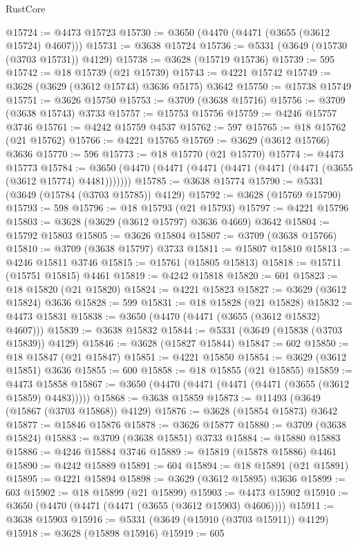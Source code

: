 \begin{lexlean}{RustCore}
\begin{coremodule}
@15724 := @4473 @15723
@15730 := @3650 (@4470 (@4471 (@3655 (@3612 @15724) @4607)))
@15731 := @3638 @15724
@15736 := @5331 (@3649 (@15730 (@3703 @15731)) @4129)
@15738 := @3628 (@15719 @15736)
@15739 := 595
@15742 := @18 @15739 (@21 @15739)
@15743 := @4221 @15742
@15749 := @3628 (@3629 (@3612 @15743) @3636 @5175) @3642
@15750 := @15738 @15749
@15751 := @3626 @15750
@15753 := @3709 (@3638 @15716)
@15756 := @3709 (@3638 @15743) @3733
@15757 := @15753 @15756
@15759 := @4246 @15757 @3746
@15761 := @4242 @15759 @4537
@15762 := 597
@15765 := @18 @15762 (@21 @15762)
@15766 := @4221 @15765
@15769 := @3629 (@3612 @15766) @3636
@15770 := 596
@15773 := @18 @15770 (@21 @15770)
@15774 := @4473 @15773
@15784 := @3650 (@4470 (@4471 (@4471 (@4471 (@4471 (@4471 (@3655 (@3612 @15774) @4481)))))))
@15785 := @3638 @15774
@15790 := @5331 (@3649 (@15784 (@3703 @15785)) @4129)
@15792 := @3628 (@15769 @15790)
@15793 := 598
@15796 := @18 @15793 (@21 @15793)
@15797 := @4221 @15796
@15803 := @3628 (@3629 (@3612 @15797) @3636 @4669) @3642
@15804 := @15792 @15803
@15805 := @3626 @15804
@15807 := @3709 (@3638 @15766)
@15810 := @3709 (@3638 @15797) @3733
@15811 := @15807 @15810
@15813 := @4246 @15811 @3746
@15815 := @15761 (@15805 @15813)
@15818 := @15711 (@15751 @15815) @4461
@15819 := @4242 @15818
@15820 := 601
@15823 := @18 @15820 (@21 @15820)
@15824 := @4221 @15823
@15827 := @3629 (@3612 @15824) @3636
@15828 := 599
@15831 := @18 @15828 (@21 @15828)
@15832 := @4473 @15831
@15838 := @3650 (@4470 (@4471 (@3655 (@3612 @15832) @4607)))
@15839 := @3638 @15832
@15844 := @5331 (@3649 (@15838 (@3703 @15839)) @4129)
@15846 := @3628 (@15827 @15844)
@15847 := 602
@15850 := @18 @15847 (@21 @15847)
@15851 := @4221 @15850
@15854 := @3629 (@3612 @15851) @3636
@15855 := 600
@15858 := @18 @15855 (@21 @15855)
@15859 := @4473 @15858
@15867 := @3650 (@4470 (@4471 (@4471 (@4471 (@3655 (@3612 @15859) @4483)))))
@15868 := @3638 @15859
@15873 := @11493 (@3649 (@15867 (@3703 @15868)) @4129)
@15876 := @3628 (@15854 @15873) @3642
@15877 := @15846 @15876
@15878 := @3626 @15877
@15880 := @3709 (@3638 @15824)
@15883 := @3709 (@3638 @15851) @3733
@15884 := @15880 @15883
@15886 := @4246 @15884 @3746
@15889 := @15819 (@15878 @15886) @4461
@15890 := @4242 @15889
@15891 := 604
@15894 := @18 @15891 (@21 @15891)
@15895 := @4221 @15894
@15898 := @3629 (@3612 @15895) @3636
@15899 := 603
@15902 := @18 @15899 (@21 @15899)
@15903 := @4473 @15902
@15910 := @3650 (@4470 (@4471 (@4471 (@3655 (@3612 @15903) @4606))))
@15911 := @3638 @15903
@15916 := @5331 (@3649 (@15910 (@3703 @15911)) @4129)
@15918 := @3628 (@15898 @15916)
@15919 := 605

\end{coremodule}
\end{lexlean}
